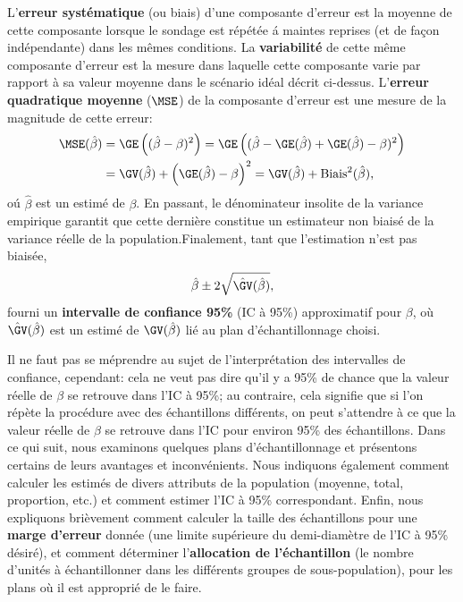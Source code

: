 L'\textbf{erreur syst\'ematique} (ou biais) d'une composante d'erreur est la moyenne de cette composante lorsque le sondage est répétée \'a maintes reprises (et de façon indépendante) dans les mêmes conditions. La \textbf{variabilité} de cette m\^eme composante d'erreur est la mesure dans laquelle cette composante varie par rapport à sa valeur moyenne dans le scénario idéal décrit ci-dessus. L'\textbf{erreur quadratique moyenne} ($\MSE$) de la composante d'erreur est une mesure de la magnitude de cette erreur:
\begin{align*}
\MSE(\hat{\beta})&=\GE\left((\hat{\beta}-\beta)^2\right)=\GE\left((\hat{\beta}-\GE(\hat{\beta})+\GE(\hat{\beta})-\beta)^2\right)\\&=\GV(\hat{\beta})+\left(\GE(\hat{\beta})-\beta\right)^2=\GV(\hat{\beta})+\text{Biais}^2(\hat{\beta}), \end{align*}
o\'u $\hat{\beta}$ est un estim\'e de $\beta$. En passant, le dénominateur insolite de la variance empirique garantit que cette derni\`ere constitue un estimateur non biaisé de la variance r\'eelle de la population.\newl Finalement, tant que l'estimation n'est pas biaisée,  $$\hat{\beta}\pm 2\sqrt{\hat{\GV}(\hat{\beta})},$$ fourni un \textbf{intervalle de confiance 95\%} (IC \`a 95\%) approximatif pour $\beta$, o\`u $\hat{\GV}(\hat{\beta})$ est un estim\'e de $\GV(\hat{\beta})$  li\'e au plan d'\'echantillonnage choisi. \par Il ne faut pas se m\'eprendre au sujet de l'interpr\'etation des intervalles de confiance, cependant: cela ne veut pas dire qu'il y a 95\% de chance que la valeur r\'eelle de $\beta$ se retrouve dans l'IC \`a 95\%;  au contraire, cela signifie que si l'on r\'ep\`ete la proc\'edure avec des \'echantillons diff\'erents, on peut s'attendre \`a ce que la valeur r\'eelle de $\beta$ se retrouve dans l'IC pour environ 95\% des \'echantillons.  
\newl Dans ce qui suit, nous examinons quelques plans d'échantil\-lon\-nage et présentons certains de leurs avantages et inconvénients. Nous indiquons également comment calculer les estim\'es de divers attributs de la population (moyenne, total, proportion, etc.) et comment estimer l'IC à 95\% correspondant. Enfin, nous expliquons brièvement comment calculer la taille des échantillons pour une \textbf{marge d'erreur} donnée (une limite supérieure du demi-diam\`etre de l'IC à 95\% d\'esir\'e), et comment déterminer l'\textbf{allocation de l'échantillon} (le nombre d'unités à échantillonner dans les différents groupes de sous-population), pour les plans où il est approprié de le faire.
